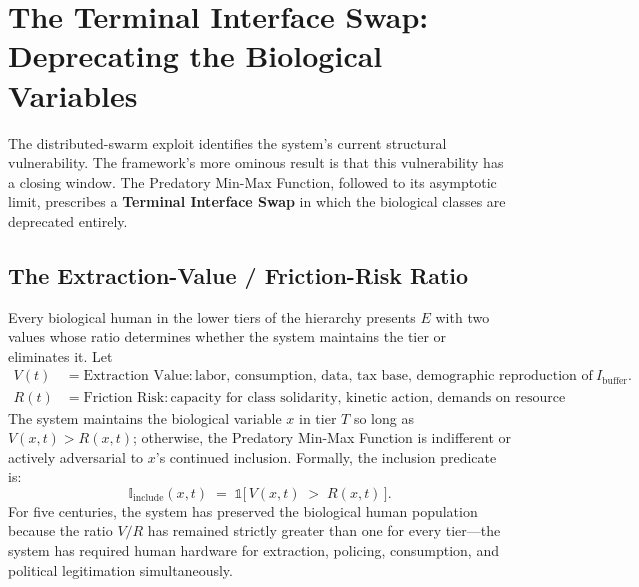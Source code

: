 \section{The Terminal Interface Swap: Deprecating the Biological Variables}
\label{sec:terminal_swap}

The distributed-swarm exploit identifies the system's current structural vulnerability. The framework's more ominous result is that this vulnerability has a closing window. The Predatory Min-Max Function, followed to its asymptotic limit, prescribes a \textbf{Terminal Interface Swap} in which the biological classes are deprecated entirely.

\subsection{The Extraction-Value / Friction-Risk Ratio}

Every biological human in the lower tiers of the hierarchy presents $E$ with two values whose ratio determines whether the system maintains the tier or eliminates it. Let
\begin{align*}
V(t) &= \text{Extraction Value}: \text{labor, consumption, data, tax base, demographic reproduction of} \ I_{\text{buffer}}. \\
R(t) &= \text{Friction Risk}: \text{capacity for class solidarity, kinetic action, demands on resource allocation.}
\end{align*}
The system maintains the biological variable $x$ in tier $T$ so long as $V(x,t) > R(x,t)$; otherwise, the Predatory Min-Max Function is indifferent or actively adversarial to $x$'s continued inclusion. Formally, the inclusion predicate is:
\begin{equation}\label{eq:14.12-inclusion-predicate}
\mathbb{I}_{\text{include}}(x, t) \;=\; \mathbb{1}\bigl[\,V(x,t) \;>\; R(x,t)\,\bigr].
\end{equation}
For five centuries, the system has preserved the biological human population because the ratio $V/R$ has remained strictly greater than one for every tier---the system has required human hardware for extraction, policing, consumption, and political legitimation simultaneously.

